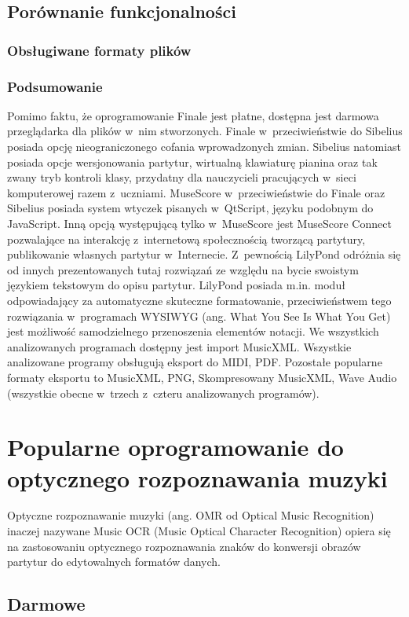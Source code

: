 \documentclass[polish,thesis,12pt]{dcsbook}
\begin{document}
\subsection{Porównanie funkcjonalności}
\subsubsection{Obsługiwane formaty plików}



\subsubsection{Podsumowanie}
Pomimo faktu, że oprogramowanie Finale jest płatne, dostępna jest darmowa przeglądarka dla plików w~nim stworzonych. Finale w~przeciwieństwie do Sibelius posiada opcję nieograniczonego cofania wprowadzonych zmian. Sibelius natomiast posiada opcje wersjonowania partytur, wirtualną klawiaturę pianina oraz tak zwany tryb kontroli klasy, przydatny dla nauczycieli pracujących w~sieci komputerowej razem z~uczniami. MuseScore w~przeciwieństwie do Finale oraz Sibelius posiada system wtyczek pisanych w~QtScript, języku podobnym do JavaScript. Inną opcją występującą tylko w~MuseScore jest MuseScore Connect pozwalające na interakcję z~internetową społecznością tworzącą partytury, publikowanie własnych partytur w~Internecie. Z~pewnością LilyPond odróżnia się od innych prezentowanych tutaj rozwiązań ze względu na bycie swoistym językiem tekstowym do opisu partytur. LilyPond posiada m.in. moduł odpowiadający za automatyczne skuteczne formatowanie, przeciwieństwem tego rozwiązania w~programach WYSIWYG (ang. What You See Is What You Get) jest możliwość samodzielnego przenoszenia elementów notacji. We wszystkich analizowanych programach dostępny jest import MusicXML. Wszystkie analizowane programy obsługują eksport do MIDI, PDF. Pozostałe popularne formaty eksportu to MusicXML, PNG, Skompresowany MusicXML, Wave Audio (wszystkie obecne w~trzech z~czteru analizowanych programów).

\section{Popularne oprogramowanie do optycznego rozpoznawania muzyki}
Optyczne rozpoznawanie muzyki (ang. OMR od Optical Music Recognition) inaczej nazywane Music OCR (Music Optical Character Recognition) opiera się na zastosowaniu optycznego rozpoznawania znaków do konwersji obrazów partytur do edytowalnych formatów danych.
\subsection{Darmowe}
\end{document}
